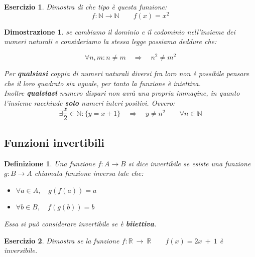 \documentclass[12pt, a4paper]{article}
\theoremstyle{break}
\newtheorem{defn}{Definizione}
\theoremstyle{lemma}
\newtheorem{eser}{Esercizio}
\theoremstyle{lemma}
\newtheorem{dimo}{Dimostrazione}
\theoremstyle{lemma}
\begin{document}
\begin{eser}
Dimostra di che tipo è questa funzione:\\
\begin{equation}
  f :\mathbb{N}\rightarrow \mathbb{N} \qquad f(x)=x^2
\end{equation}
\end{eser}

\begin{dimo}
  se cambiamo il dominio e il codominio nell'insieme dei numeri naturali e consideriamo la stessa legge possiamo deddure che:

\begin{equation}
  \forall n,m : n \ne m \quad \Rightarrow \quad n^2 \ne m^2
\end{equation}

\vspace{3.5mm}
Per \textbf{qualsiasi} coppia di numeri naturali diversi fra loro non è possibile pensare che il loro quadrato sia uguale, per tanto la funzione è iniettiva. \\
\vspace{2.5mm}
Inoltre \textbf{qualsiasi} numero dispari non avrà una propria immagine, in quanto l'insieme racchiude \textbf{solo} numeri interi positivi. Ovvero:\\

\begin{equation}
  \exists \frac{x}{2} \in \mathbb{N}: \{y = x + 1\} \quad
  \Rightarrow \quad y \ne n^2 \qquad \forall n\in \mathbb{N}
\end{equation}

\end{dimo}


\subsection{Funzioni invertibili}
\begin{defn} Una funzione $f:A\rightarrow B$ si dice invertibile se esiste una funzione $g: B \rightarrow A$ chiamata funzione inversa tale che:
\begin{itemize}
  \item $\forall a\in A, \quad g(f(a))=a$
  \item $\forall b\in B, \quad f(g(b))=b$
\end{itemize}
Essa si può considerare invertibile se è \textbf{biiettiva}.
\end{defn}

\begin{eser}
  Dimostra se la funzione $f: \mathbb{R} \ \rightarrow \ \mathbb{R} \qquad f(x) = 2x\ +\ 1$ è inversibile.
\end{eser}
\end{document}
